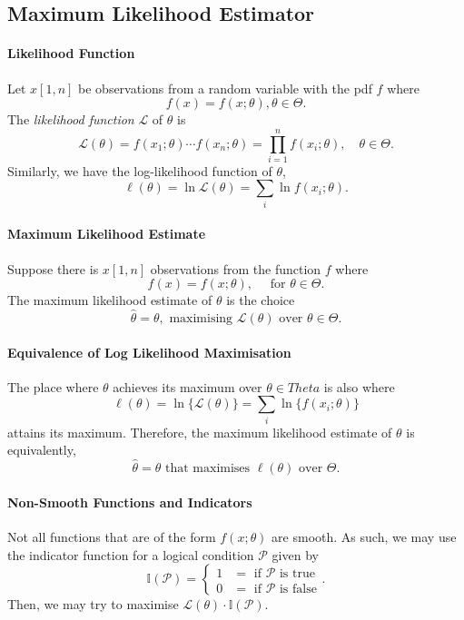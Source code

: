 \subsection{Maximum Likelihood Estimator}

\paragraph{Likelihood Function}
Let \(x[1, n]\) be observations from a random variable with the pdf \(f\)
where  \[
  f(x) = f(x; \theta), \theta \in \Theta
.\] The \textit{likelihood function} \(\mathcal{L}\) of \(\theta\) is \[
  \mathcal{L}(\theta) = f(x_1; \theta) \cdots f(x_n; \theta)
  = \prod_{i = 1}^n f(x_i; \theta), \quad \theta \in \Theta
.\] 
Similarly, we have the log-likelihood function of \(\theta\), \[
  \ell(\theta) = \ln{\mathcal{L}(\theta)} = \sum_i \ln{f(x_i; \theta)}
.\] 

\paragraph{Maximum Likelihood Estimate}
Suppose there is \(x[1, n]\) observations from the function \(f\) where \[
  f(x) = f(x; \theta), \quad \text{ for } \theta \in  \Theta
.\]
The maximum likelihood estimate of \(\theta\) is the choice \[
  \hat{\theta} = \theta, \text{ maximising } \mathcal{L}(\theta) \text{ over } \theta \in \Theta
.\] 

\paragraph{Equivalence of Log Likelihood Maximisation}
The place where \(\mathcal{\theta}\) achieves its maximum over \(\theta \in Theta\)
is also where \[
  \ell(\theta) = \ln \{\mathcal{L}(\theta)\} = \sum_{i} \ln \{f(x_i; \theta)\} 
\]  attains its maximum. Therefore, the maximum likelihood estimate of \(\theta\)
is equivalently, \[
  \hat{\theta} = \theta \text{ that maximises } \ell(\theta) \text{ over } \Theta
.\] 

\paragraph{Non-Smooth Functions and Indicators}
Not all functions that are of the form \(f(x; \theta)\) are smooth. As such, we
may use the indicator function for a logical condition \(\mathcal{P}\) given by
\[
  \mathbb{I}(\mathcal{P}) = \begin{cases}
    1 &= \text{ if } \mathcal{P} \text{ is true} \\
    0 &= \text{ if } \mathcal{P} \text{ is false}
  \end{cases}
.\]
Then, we may try to maximise \(\mathcal{L}(\theta)\cdot \mathbb{I}(\mathcal{P})\).

